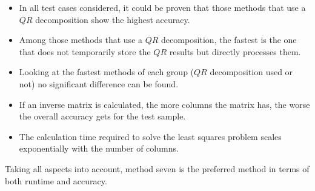 \begin{itemize}
	\item In all test cases considered, it could be proven that those methods that use a $QR$ decomposition show the highest accuracy.
	\item Among those methods that use a $QR$ decomposition, the fastest is the one that does not temporarily store the $QR$ results but directly processes them. 
	\item Looking at the fastest methods of each group ($QR$ decomposition used or not) no significant difference can be found.
	\item If an inverse matrix is calculated, the more columns the matrix has, the worse the overall accuracy gets for the test sample.
	\item The calculation time required to solve the least squares problem scales exponentially with the number of columns.
\end{itemize} 

Taking all aspects into account, method seven is the preferred method in terms of both runtime and accuracy. 